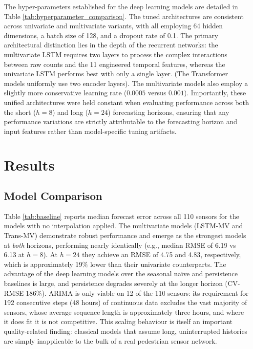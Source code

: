 \documentclass[journal,sensors,submit,pdftex,moreauthors]{Definitions/mdpi}
\begin{document}
The hyper-parameters established for the deep learning models are detailed in Table \ref{tab:hyperparameter_comparison}. The tuned architectures are consistent across univariate and multivariate variants, with all employing 64 hidden dimensions, a batch size of 128, and a dropout rate of 0.1. The primary architectural distinction lies in the depth of the recurrent networks: the multivariate LSTM requires two layers to process the complex interactions between raw counts and the 11 engineered temporal features, whereas the univariate LSTM performs best with only a single layer. (The Transformer models uniformly use two encoder layers). The multivariate models also employ a slightly more conservative learning rate ($0.0005$ versus $0.001$). Importantly, these unified architectures were held constant when evaluating performance across both the short ($h=8$) and long ($h=24$) forecasting horizons, ensuring that any performance variations are strictly attributable to the forecasting horizon and input features rather than model-specific tuning artifacts.

\section{Results}\label{results}

\subsection{Model Comparison}

Table \ref{tab:baseline} reports median forecast error across all 110 sensors for the models with no interpolation applied. The multivariate models (LSTM-MV and Trans-MV) demonstrate robust performance and emerge as the strongest models at \emph{both} horizons, performing nearly identically (e.g., median RMSE of 6.19 vs 6.13 at $h=8$). At $h=24$ they achieve an RMSE of 4.75 and 4.83, respectively, which is approximately 19\% lower than their univariate counterparts. The advantage of the deep learning models over the seasonal na\"ive and persistence baselines is large, and persistence degrades severely at the longer horizon (CV-RMSE 186\%). ARIMA is only viable on 12 of the 110 sensors: its requirement for 192 consecutive steps (48 hours) of continuous data excludes the vast majority of sensors, whose average sequence length is approximately three hours, and where it does fit it is not competitive. This scaling behaviour is itself an important quality-related finding: classical models that assume long, uninterrupted histories are simply inapplicable to the bulk of a real pedestrian sensor network.
\end{document}
